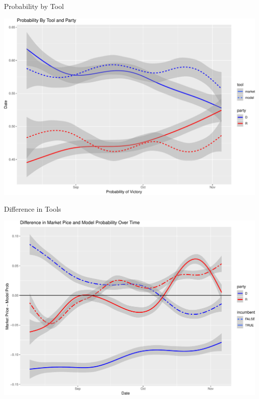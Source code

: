 \documentclass[ignorenonframetext,]{beamer}
\begin{document}
\begin{frame}{Probability by Tool}

\includegraphics{markets_models_files/figure-beamer/prob tool-1.pdf}

\end{frame}

\begin{frame}{Difference in Tools}

\includegraphics{markets_models_files/figure-beamer/diff-1.pdf}

\end{frame}
\end{document}
